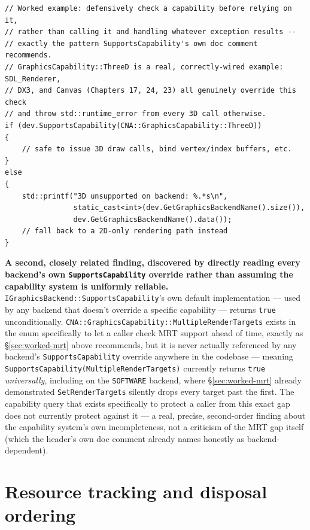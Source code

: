 \begin{lstlisting}
// Worked example: defensively check a capability before relying on it,
// rather than calling it and handling whatever exception results --
// exactly the pattern SupportsCapability's own doc comment recommends.
// GraphicsCapability::ThreeD is a real, correctly-wired example: SDL_Renderer,
// DX3, and Canvas (Chapters 17, 24, 23) all genuinely override this check
// and throw std::runtime_error from every 3D call otherwise.
if (dev.SupportsCapability(CNA::GraphicsCapability::ThreeD))
{
    // safe to issue 3D draw calls, bind vertex/index buffers, etc.
}
else
{
    std::printf("3D unsupported on backend: %.*s\n",
                static_cast<int>(dev.GetGraphicsBackendName().size()),
                dev.GetGraphicsBackendName().data());
    // fall back to a 2D-only rendering path instead
}
\end{lstlisting}

\begin{sourcenote}
\textbf{A second, closely related finding, discovered by directly reading every backend's own
\texttt{SupportsCapability} override rather than assuming the capability system is uniformly
reliable.} \texttt{IGraphicsBackend::SupportsCapability}'s own default implementation --- used
by any backend that doesn't override a specific capability --- returns \texttt{true}
unconditionally. \texttt{CNA::GraphicsCapability::MultipleRenderTargets} exists in the enum
specifically to let a caller check MRT support ahead of time, exactly as
\S\ref{sec:worked-mrt} above recommends, but it is never actually referenced by any backend's
\texttt{SupportsCapability} override anywhere in the codebase --- meaning
\texttt{SupportsCapability(MultipleRenderTargets)} currently returns \texttt{true}
\emph{universally}, including on the \texttt{SOFTWARE} backend, where
\S\ref{sec:worked-mrt} already demonstrated \texttt{SetRenderTargets} silently drops every
target past the first. The capability query that exists specifically to protect a caller from
this exact gap does not currently protect against it --- a real, precise, second-order finding
about the capability system's own incompleteness, not a criticism of the MRT gap itself (which
the header's own doc comment already names honestly as backend-dependent).
\end{sourcenote}

\section{Resource tracking and disposal ordering}
\label{sec:resource-lifetime}

